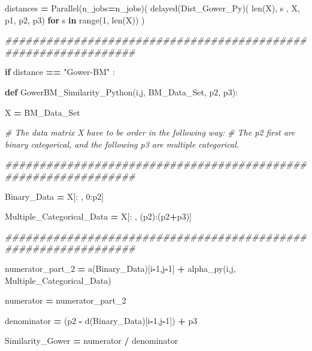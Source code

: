 \documentclass[
  11pt,
  a4paper,
]{article}
\newenvironment{Shaded}{\begin{snugshade}}{\end{snugshade}}
\newcommand{\BuiltInTok}[1]{#1}
\newcommand{\CommentTok}[1]{\textcolor[rgb]{0.56,0.35,0.01}{\textit{#1}}}
\newcommand{\ControlFlowTok}[1]{\textcolor[rgb]{0.13,0.29,0.53}{\textbf{#1}}}
\newcommand{\DecValTok}[1]{\textcolor[rgb]{0.00,0.00,0.81}{#1}}
\newcommand{\KeywordTok}[1]{\textcolor[rgb]{0.13,0.29,0.53}{\textbf{#1}}}
\newcommand{\NormalTok}[1]{#1}
\newcommand{\OperatorTok}[1]{\textcolor[rgb]{0.81,0.36,0.00}{\textbf{#1}}}
\newcommand{\StringTok}[1]{\textcolor[rgb]{0.31,0.60,0.02}{#1}}
\begin{document}
\begin{Shaded}
\begin{Highlighting}[]
\NormalTok{        distances }\OperatorTok{=}\NormalTok{ Parallel(n\_jobs}\OperatorTok{=}\NormalTok{n\_jobs)( delayed(Dist\_Gower\_Py)( }\BuiltInTok{len}\NormalTok{(X), s , X, p1, p2, p3) }\ControlFlowTok{for}\NormalTok{ s }\KeywordTok{in} \BuiltInTok{range}\NormalTok{(}\DecValTok{1}\NormalTok{, }\BuiltInTok{len}\NormalTok{(X)) )}

\CommentTok{\#\#\#\#\#\#\#\#\#\#\#\#\#\#\#\#\#\#\#\#\#\#\#\#\#\#\#\#\#\#\#\#\#\#\#\#\#\#\#\#\#\#\#\#\#\#\#\#\#\#\#\#\#\#\#\#\#\#\#\#\#\#\#}

    \ControlFlowTok{if}\NormalTok{ distance }\OperatorTok{==} \StringTok{"Gower{-}BM"}\NormalTok{ :}

        \KeywordTok{def}\NormalTok{ GowerBM\_Similarity\_Python(i,j, BM\_Data\_Set, p2, p3):}

\NormalTok{            X }\OperatorTok{=}\NormalTok{ BM\_Data\_Set}

          \CommentTok{\# The data matrix X have to be order in the following way:}
          \CommentTok{\# The p2 first are binary categorical, and the following p3 are multiple categorical.}

\CommentTok{\#\#\#\#\#\#\#\#\#\#\#\#\#\#\#\#\#\#\#\#\#\#\#\#\#\#\#\#\#\#\#\#\#\#\#\#\#\#\#\#\#\#\#\#\#\#\#\#\#\#\#\#\#\#\#\#\#\#\#\#\#\#\#}
       
\NormalTok{            Binary\_Data }\OperatorTok{=}\NormalTok{ X[: , }\DecValTok{0}\NormalTok{:p2]}

\NormalTok{            Multiple\_Categorical\_Data }\OperatorTok{=}\NormalTok{ X[: , (p2):(p2}\OperatorTok{+}\NormalTok{p3)]}
 
\CommentTok{\#\#\#\#\#\#\#\#\#\#\#\#\#\#\#\#\#\#\#\#\#\#\#\#\#\#\#\#\#\#\#\#\#\#\#\#\#\#\#\#\#\#\#\#\#\#\#\#\#\#\#\#\#\#\#\#\#\#\#\#\#\#\#}

 
\NormalTok{            numerator\_part\_2 }\OperatorTok{=}\NormalTok{ a(Binary\_Data)[i}\OperatorTok{{-}}\DecValTok{1}\NormalTok{,j}\OperatorTok{{-}}\DecValTok{1}\NormalTok{] }\OperatorTok{+}\NormalTok{ alpha\_py(i,j, Multiple\_Categorical\_Data)}

\NormalTok{            numerator }\OperatorTok{=}\NormalTok{ numerator\_part\_2}

\NormalTok{            denominator }\OperatorTok{=}\NormalTok{ (p2 }\OperatorTok{{-}}\NormalTok{ d(Binary\_Data)[i}\OperatorTok{{-}}\DecValTok{1}\NormalTok{,j}\OperatorTok{{-}}\DecValTok{1}\NormalTok{]) }\OperatorTok{+}\NormalTok{ p3}

\NormalTok{            Similarity\_Gower }\OperatorTok{=}\NormalTok{ numerator }\OperatorTok{/}\NormalTok{ denominator  }


\end{Highlighting}
\end{Shaded}
\end{document}
